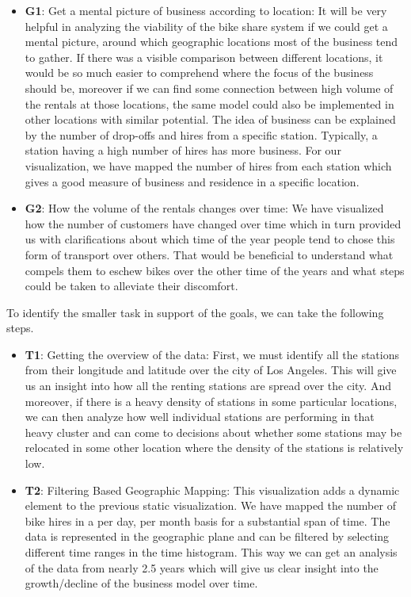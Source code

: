 \begin{itemize}
    \item \textbf{G1}: Get a mental picture of business according to location:
    It will be very helpful in analyzing the viability of the bike share system if we could get a mental picture, around which geographic locations most of the business tend to gather. If there was a visible comparison between different locations, it would be so much easier to comprehend where the focus of the business should be, moreover if we can find some connection between high volume of the rentals at those locations, the same model could also be implemented in other locations with similar potential. The idea of business can be explained by the number of drop-offs and hires from a specific station. Typically, a station having a high number of hires has more business. For our visualization, we have mapped the number of hires from each station which gives a good measure of business and residence in a specific location.

    \item \textbf{G2}: How the volume of the rentals changes over time:
    We have visualized how the number of customers have changed over time which in turn provided us with clarifications about which time of the year people tend to chose this form of transport over others. That would be beneficial to understand what compels them to eschew bikes over the other time of the years and what steps could be taken to alleviate their discomfort.
 
\end{itemize}

To identify the smaller task in support of the goals, we can take the following steps.

\begin{itemize}
    \item \textbf{T1}: Getting the overview of the data: 
    First, we must identify all the stations from their longitude and latitude over the city of Los Angeles. This will give us an insight into how all the renting stations are spread over the city. And moreover, if there is a heavy density of stations in some particular locations, we can then analyze how well individual stations are performing in that heavy cluster and can come to decisions about whether some stations may be relocated in some other location where the density of the stations is relatively low.

    \item \textbf{T2}: Filtering Based Geographic Mapping:
    This visualization adds a dynamic element to the previous static visualization. We have mapped the number of bike hires in a per day, per month basis for a substantial span of time. The data is represented in the geographic plane and can be filtered by selecting different time ranges in the time histogram. This way we can get an analysis of the data from nearly 2.5 years which will give us clear insight into the growth/decline of the business model over time.

\end{itemize}


